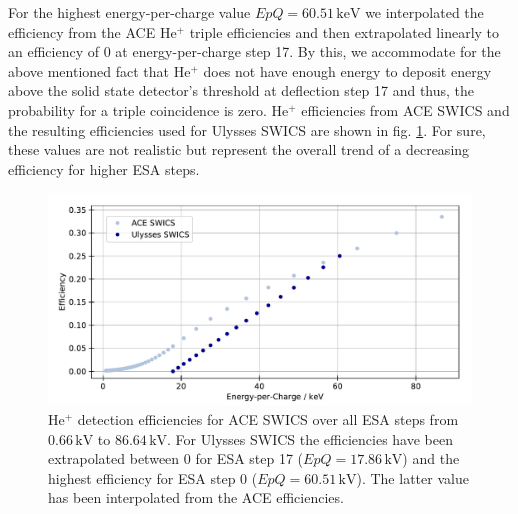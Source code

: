 For the highest energy-per-charge value $EpQ = 60.51\,\mathrm{keV}$ we interpolated the efficiency from the ACE $\mathrm{He^{+}}$ triple efficiencies and then extrapolated linearly to an efficiency of 0 at energy-per-charge step 17. By this, we accommodate for the above mentioned fact that $\mathrm{He^{+}}$ does not have enough energy to deposit energy above the solid state detector's threshold at deflection step 17 and thus, the probability for a triple coincidence is zero. $\mathrm{He^{+}}$ efficiencies from ACE SWICS and the resulting efficiencies used for Ulysses SWICS are shown in fig. \ref{fig:guess_eff}. For sure, these values are not realistic but represent the overall trend of a decreasing efficiency for higher ESA steps.
\begin{figure}[h]
	\includegraphics[width=1.\textwidth]{Figures/guess_eff.pdf}
	\centering
	\caption{$\mathrm{He^{+}}$ detection efficiencies for ACE SWICS over all ESA steps from $0.66\,\mathrm{kV}$ to $86.64\,\mathrm{kV}$. For Ulysses SWICS the efficiencies have been extrapolated between 0 for ESA step 17 ($EpQ = 17.86\,\mathrm{kV}$) and the highest efficiency for ESA step 0 ($EpQ =60.51\,\mathrm{kV}$). The latter value has been interpolated from the ACE efficiencies.}
	\label{fig:guess_eff}
\end{figure}


